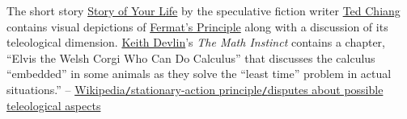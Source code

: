 \documentclass[oneside]{book}
\numberwithin{equation}{section}
\begin{document}
The short story \href{https://en.wikipedia.org/wiki/Story_of_Your_Life}{Story of Your Life} by the speculative fiction writer \href{https://en.wikipedia.org/wiki/Ted_Chiang}{Ted Chiang} contains visual depictions of \href{https://en.wikipedia.org/wiki/Fermat%27s_Principle}{Fermat's Principle} along with a discussion of its teleological dimension. \href{https://en.wikipedia.org/wiki/Keith_Devlin}{Keith Devlin}'s \textit{The Math Instinct} contains a chapter, ``Elvis the Welsh Corgi Who Can Do Calculus'' that discusses the calculus ``embedded'' in some animals as they solve the ``least time'' problem in actual situations.'' -- \href{https://en.wikipedia.org/wiki/Stationary-action_principle#Disputes_about_possible_teleological_aspects}{Wikipedia\texttt{/}stationary-action principle\texttt{/}disputes about possible teleological aspects}


\printbibliography[heading=bibintoc]
	
\end{document}
